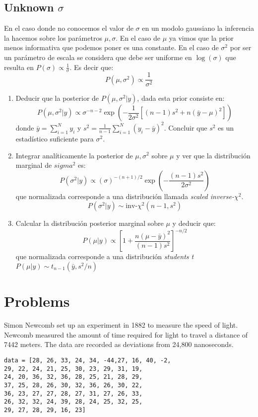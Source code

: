 \documentclass[12pt]{paper}
\begin{document}
\subsection{Unknown $\sigma$}
En el caso donde no conocemos el valor de $\sigma$ en un modolo gaussiano la inferencia la hacemos sobre los parámetros $\mu,\sigma$. En el caso de $\mu$ ya vimos que la prior menos informativa que podemos poner es una constante. En el caso de $\sigma^{2}$ por ser un parámetro de escala se considera que debe ser uniforme en $\log (\sigma)$ que resulta en $P(\sigma) \propto \frac{1}{\sigma}$. Es decir que:
\begin{equation}
P(\mu,\sigma^{2}) \propto \frac{1}{\sigma^{2}}
\end{equation}
\begin{enumerate}


\item Deducir que la posterior de $P(\mu,\sigma^{2}|y)$, dada esta prior consiste en:
\begin{equation}
P(\mu,\sigma^{2}|y) \propto \sigma^{-n-2}\exp \left(-\frac{1}{2\sigma^{2}} [(n-1)s^{2} + n(\bar{y}-\mu)^{2}]\right)
\end{equation}
donde $\bar{y} =\sum_{i=1}^{N} y_{i}$ y $s^{2} = \frac{1}{n-1} \sum_{i=1}^{N}(y_{i}-\bar{y})^{2}$. Concluir que $s^{2}$ es un estadístico suficiente para $\sigma^{2}$.

\item Integrar analíticamente la posterior de $\mu,\sigma^{2}$ sobre $\mu$ y ver que la distribución marginal de $sigma^{2}$ es:
\begin{equation}
P(\sigma^{2}|y) \propto (\sigma)^{-(n+1)/2} \exp\left(-\frac{(n-1)s^{2}}{2\sigma^{2}}\right)
\end{equation}
que normalizada corresponde a una distribución llamada \textit{scaled inverse-}$\chi^{2}$.
\begin{equation}
P(\sigma^{2}|y) \sim \text{inv-}\chi^{2}(n-1,s^{2})
\end{equation}

\item Calcular la distribución posterior marginal sobre $\mu$ y deducir que:
$$
P(\mu|y) \propto \left[1 + \frac{n(\mu-\bar{y})^{2}}{(n-1)s^{2}}\right]^{-n/2}
$$
que normalizada corresponde a una distribución \textit{students t} $P(\mu|y) \sim t_{n-1}(\bar{y},s^{2}/n)$
\end{enumerate}

\newpage
\section{Problems}
Simon Newcomb set up an experiment in 1882 to measure the speed of light. Newcomb measured the amount of time required for light to travel a distance of 7442 meters. The data are recorded as deviations from 24,800 nanoseconds. 
\begin{verbatim}
data = [28, 26, 33, 24, 34, -44,27, 16, 40, -2,
29, 22, 24, 21, 25, 30, 23, 29, 31, 19,
24, 20, 36, 32, 36, 28, 25, 21, 28, 29,
37, 25, 28, 26, 30, 32, 36, 26, 30, 22,
36, 23, 27, 27, 28, 27, 31, 27, 26, 33,
26, 32, 32, 24, 39, 28, 24, 25, 32, 25,
29, 27, 28, 29, 16, 23] 
\end{verbatim}
\end{document}
